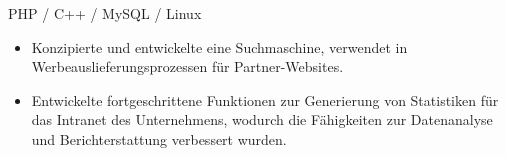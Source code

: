 PHP / C++ / MySQL / Linux
\begin{itemize}
\item Konzipierte und entwickelte eine Suchmaschine, verwendet in Werbeauslieferungsprozessen für Partner-Websites.
\item Entwickelte fortgeschrittene Funktionen zur Generierung von Statistiken für das Intranet des Unternehmens, wodurch die Fähigkeiten zur Datenanalyse und Berichterstattung verbessert wurden.
\end{itemize}
\divider
